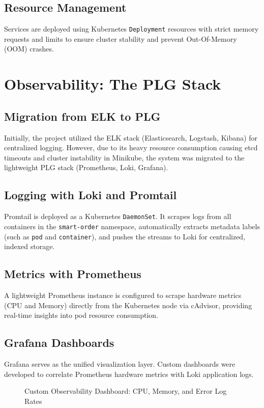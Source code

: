 \documentclass[12pt,a4paper]{report}
\begin{document}
\section{Resource Management}
Services are deployed using Kubernetes \texttt{Deployment} resources with strict memory requests and limits to ensure cluster stability and prevent Out-Of-Memory (OOM) crashes.

\chapter{Observability: The PLG Stack}

\section{Migration from ELK to PLG}
Initially, the project utilized the ELK stack (Elasticsearch, Logstash, Kibana) for centralized logging. However, due to its heavy resource consumption causing etcd timeouts and cluster instability in Minikube, the system was migrated to the lightweight PLG stack (Prometheus, Loki, Grafana).

\section{Logging with Loki and Promtail}
Promtail is deployed as a Kubernetes \texttt{DaemonSet}. It scrapes logs from all containers in the \texttt{smart-order} namespace, automatically extracts metadata labels (such as \texttt{pod} and \texttt{container}), and pushes the streams to Loki for centralized, indexed storage.

\section{Metrics with Prometheus}
A lightweight Prometheus instance is configured to scrape hardware metrics (CPU and Memory) directly from the Kubernetes node via cAdvisor, providing real-time insights into pod resource consumption.

\section{Grafana Dashboards}
Grafana serves as the unified visualization layer. Custom dashboards were developed to correlate Prometheus hardware metrics with Loki application logs. 

\begin{figure}[H]
    \centering
    \caption{Custom Observability Dashboard: CPU, Memory, and Error Log Rates}
\end{figure}
\end{document}
